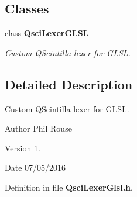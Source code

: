 \subsection*{Classes}
\begin{DoxyCompactItemize}
\item 
class {\bf Qsci\-Lexer\-G\-L\-S\-L}
\begin{DoxyCompactList}\small\item\em Custom Q\-Scintilla lexer for G\-L\-S\-L. \end{DoxyCompactList}\end{DoxyCompactItemize}


\subsection{Detailed Description}
Custom Q\-Scintilla lexer for G\-L\-S\-L. \begin{DoxyAuthor}{Author}
Phil Rouse 
\end{DoxyAuthor}
\begin{DoxyVersion}{Version}
1. 
\end{DoxyVersion}
\begin{DoxyDate}{Date}
07/05/2016 
\end{DoxyDate}


Definition in file {\bf Qsci\-Lexer\-Glsl.\-h}.

